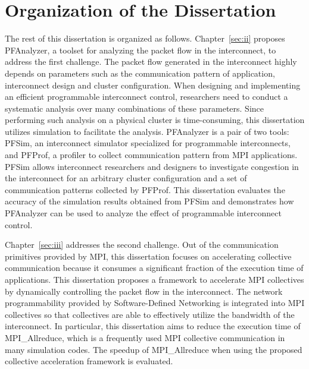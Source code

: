\section{Organization of the Dissertation}

The rest of this dissertation is organized as follows.
Chapter~\ref{sec:ii} proposes PFAnalyzer, a toolset for analyzing the
packet flow in the interconnect, to address the first challenge. The
packet flow generated in the interconnect highly depends on parameters such as
the communication pattern of application, interconnect design and cluster
configuration. When designing and implementing an efficient programmable
interconnect control, researchers need to conduct a systematic analysis over
many combinations of these parameters. Since performing such analysis on a
physical cluster is time-consuming, this dissertation utilizes simulation to
facilitate the analysis. PFAnalyzer is a pair of two tools: PFSim, an
interconnect simulator specialized for programmable interconnects, and PFProf,
a profiler to collect communication pattern from MPI applications. PFSim
allows interconnect researchers and designers to investigate congestion in the
interconnect for an arbitrary cluster configuration and a set of communication
patterns collected by PFProf. This dissertation evaluates the accuracy of the
simulation results obtained from PFSim and demonstrates how PFAnalyzer can be
used to analyze the effect of programmable interconnect control.

Chapter~\ref{sec:iii} addresses the second challenge. Out of the communication
primitives provided by MPI, this dissertation focuses on accelerating
collective communication because it consumes a significant fraction of the
execution time of applications. This dissertation proposes a framework to
accelerate MPI collectives by dynamically controlling the packet flow in the
interconnect. The network programmability provided by Software-Defined
Networking is integrated into MPI collectives so that collectives are able to
effectively utilize the bandwidth of the interconnect. In particular, this
dissertation aims to reduce the execution time of MPI\_Allreduce, which is a
frequently used MPI collective communication in many simulation codes. The
speedup of MPI\_Allreduce when using the proposed collective acceleration
framework is evaluated.

